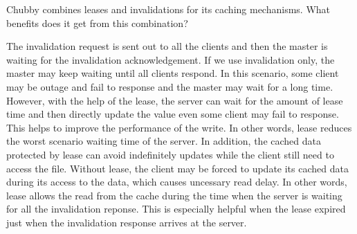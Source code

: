 \begin{QandA}
   \item Chubby combines leases and invalidations for its caching mechanisms. What benefits does it get from this combination?
         \begin{answered}
		 The invalidation request is sent out to all the clients and then the master is waiting for the invalidation acknowledgement. If we
		 use invalidation only, the master may keep waiting until all clients respond. In this scenario, some client may be outage and fail
		 to response and the master may wait for a long time. However, with the help of the lease, the server can wait for the amount of lease
		 time and then directly update the value even some client may fail to response. This helps to improve the performance of the write.
		 In other words, lease reduces the worst scenario waiting time of the server. In addition, the cached data protected by lease can avoid indefinitely updates while the client still need to access the file. Without lease, the client may be forced to update its cached data 
		 during its access to the data, which causes uncessary read delay. In other words, lease allows the read from the cache during the time
		 when the server is waiting for all the invalidation reponse. This is especially helpful when the lease expired just when the invalidation
		 response arrives at the server.
         \end{answered}
\end{QandA}